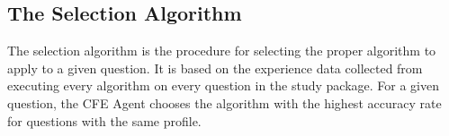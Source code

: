 \subsection{The Selection Algorithm}

The selection algorithm is the procedure for selecting the proper algorithm to apply to a given question.  It is based on the experience data collected from executing every algorithm on every question in the study package.  For a given question, the CFE Agent chooses the algorithm with the highest accuracy rate for questions with the same profile.
